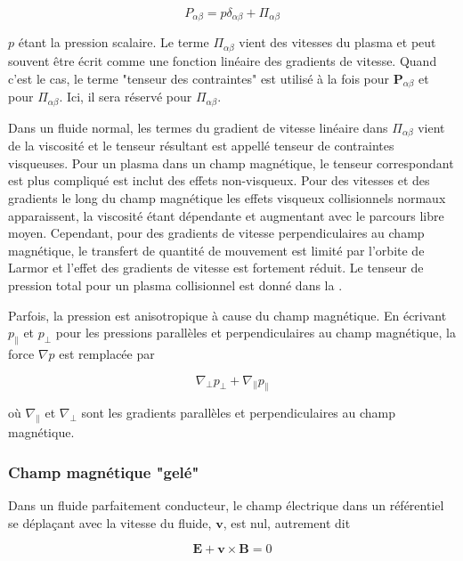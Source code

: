 \documentclass[main.tex]{subfiles}
\begin{document}
\[
	P_{\alpha \beta} = p\delta_{\alpha \beta} + \Pi_{\alpha \beta}
\]

\noindent \( p \) étant la pression scalaire.
Le terme \( \Pi_{\alpha \beta} \) vient des vitesses du plasma et peut souvent être écrit comme une fonction linéaire des gradients de vitesse.
Quand c'est le cas, le terme "tenseur des contraintes" est utilisé à la fois pour \( \bm{P}_{\alpha \beta} \) et pour \( \Pi_{\alpha \beta} \).
Ici, il sera réservé pour \( \Pi_{\alpha \beta} \).

Dans un fluide normal, les termes du gradient de vitesse linéaire dans \( \Pi_{\alpha \beta} \) vient de la viscosité et le tenseur résultant est appellé tenseur de contraintes visqueuses.
Pour un plasma dans un champ magnétique, le tenseur correspondant est plus compliqué est inclut des effets non-visqueux.
Pour des vitesses et des gradients le long du champ magnétique les effets visqueux collisionnels normaux apparaissent, la viscosité étant dépendante et augmentant avec le parcours libre moyen.
Cependant, pour des gradients de vitesse perpendiculaires au champ magnétique, le transfert de quantité de mouvement est limité par l'orbite de Larmor et l'effet des gradients de vitesse est fortement réduit.
Le tenseur de pression total pour un plasma collisionnel est donné dans la \color{red}{Section 2.23 (lien à rajouter quand elle sera faite)}\color{black}.

Parfois, la pression est anisotropique à cause du champ magnétique.
En écrivant \( p_\parallel \) et \( p_\perp \) pour les pressions parallèles et perpendiculaires au champ magnétique, la force \( \nabla p \) est remplacée par

\[
	\nabla_\perp p_\perp + \nabla_\parallel p_\parallel
\]

\noindent où \( \nabla_\parallel \) et \( \nabla_\perp \) sont les gradients parallèles et perpendiculaires au champ magnétique.

\subsubsection*{Champ magnétique "gelé"}

Dans un fluide parfaitement conducteur, le champ électrique dans un référentiel se déplaçant avec la vitesse du fluide, \( \bm{v} \), est nul, autrement dit

\begin{equation}
	\bm{E} + \bm{v} \times \bm{B} = 0
	\label{eq:force_gelée}
\end{equation}
\end{document}
